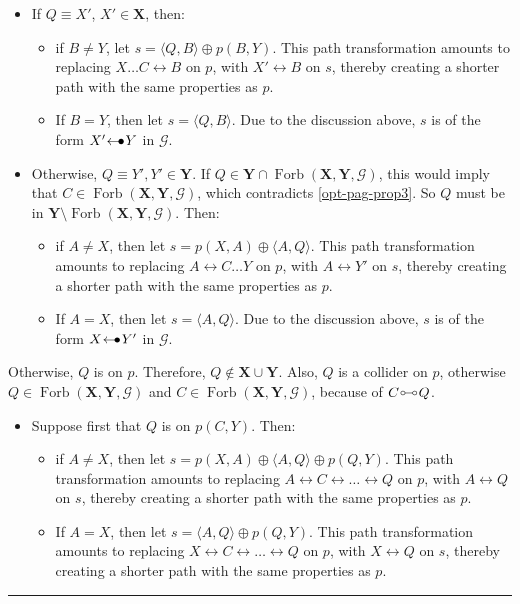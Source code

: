 \documentclass[twoside]{article}
\DeclareMathOperator{\Forb}{Forb}
\newcommand{\fb}[2][X,Y]{\Forb(\mb{#1},#2)}
\newcommand{\mb}[1]{\mathbf{#1}}
\newcommand{\g}[1][G]{\mathcal{#1}}
\newenvironment{proofof}[1][]{\begin{trivlist}
\item[\hskip \labelsep {\bfseries Proof of #1.}]}{\hfill\BlackBox\end{trivlist}}
\newcommand{\BlackBox}{\rule{1.5ex}{1.5ex}}
\newcommand{\arrowbullet}{
  \setlength{\unitlength}{1mm}
  \begin{picture}(5,1)(0,0)
    \put(0.2,0){$\leftarrow$}
    \put(3,0){$\bullet$}
  \end{picture}
}
\newcommand{\circcirc}{
  \setlength{\unitlength}{1mm}
  \begin{picture}(5,1)(0,0)
    \put(1,1){\circle{1}}
    \put(1.5,1){\line(1,0){2}}
    \put(4,1){\circle{1}}
  \end{picture}
}
\begin{document}
\begin{proofof}[Lemma \ref{lem:adjust-and-o-pag-helper}]
\begin{itemize}
        \item If $Q \equiv X'$, $X' \in \mb{X}$, then:
          \begin{itemize}
            \item if $B \neq Y$, let $s = \langle Q,B \rangle \oplus p(B,Y)$. This path transformation amounts to replacing $X \dots C \leftrightarrow B$ on $p$, with $X' \leftrightarrow B$ on $s$, thereby creating a shorter path  with the same properties as $p$.
            \item If $B =Y$, then let $s = \langle Q, B\rangle$. Due to the discussion above, $s$ is of the form $X' \arrowbullet Y$ in $\g$. 
        \end{itemize}
 
        \item Otherwise, $Q \equiv Y', Y' \in \mb{Y}$. If $Q \in \mb{Y} \cap \fb{\g}$, this would imply that $C \in \fb{\g}$, which contradicts \ref{opt-pag-prop3}. So $Q$ must be in $\mb{Y} \setminus \fb{\g}$. Then:
        \begin{itemize}
            \item if $A \neq X$, then let $s = p(X,A) \oplus \langle A,Q \rangle$. This path transformation amounts to replacing  $A \leftrightarrow C \dots Y$ on $p$, with $A \leftrightarrow Y'$ on $s$, thereby creating a shorter path  with the same properties as $p$.
            \item If $A = X$, then let $s = \langle A, Q \rangle$. Due to the discussion above, $s$ is of the form $X \arrowbullet Y'$ in $\g$. 
        \end{itemize}
    \end{itemize}

    Otherwise, $Q$ is on $p$. Therefore, $Q \notin \mb{X} \cup \mb{Y}$. Also, $Q$ is a collider on $p$, otherwise $Q \in \fb{\g}$ and $C \in \fb{\g}$, because of $C \circcirc Q$. 
    \begin{itemize}
        \item Suppose first that $Q$ is on $p(C,Y)$. Then:
        \begin{itemize}
            \item  if $A \neq X$, then let $s = p(X,A) \oplus \langle A,Q \rangle \oplus p(Q,Y)$. This path transformation amounts to replacing  $A \leftrightarrow C \leftrightarrow \dots \leftrightarrow Q $ on $p$, with $A \leftrightarrow Q$ on $s$, thereby creating a shorter path  with the same properties as $p$. 
            \item If $A = X$, then let $s = \langle A,Q \rangle \oplus p(Q,Y)$. This path transformation amounts to replacing  $X  \leftrightarrow C \leftrightarrow \dots \leftrightarrow Q$ on $p$, with $X \leftrightarrow Q$ on $s$, thereby creating a shorter path  with the same properties as $p$. 
        \end{itemize}
        

\end{itemize}
\end{proofof}
\end{document}
